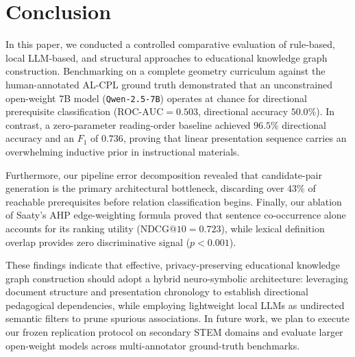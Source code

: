 \section{Conclusion}
\label{sec:conclusion}

In this paper, we conducted a controlled comparative evaluation of rule-based, local LLM-based, and structural approaches to educational knowledge graph construction. Benchmarking on a complete geometry curriculum against the human-annotated AL-CPL ground truth demonstrated that an unconstrained open-weight 7B model (\texttt{Qwen-2.5-7B}) operates at chance for directional prerequisite classification ($\text{ROC-AUC} = 0.503$, directional accuracy $50.0\%$). In contrast, a zero-parameter reading-order baseline achieved $96.5\%$ directional accuracy and an $F_1$ of $0.736$, proving that linear presentation sequence carries an overwhelming inductive prior in instructional materials.

Furthermore, our pipeline error decomposition revealed that candidate-pair generation is the primary architectural bottleneck, discarding over $43\%$ of reachable prerequisites before relation classification begins. Finally, our ablation of Saaty's AHP edge-weighting formula proved that sentence co-occurrence alone accounts for its ranking utility ($\text{NDCG@10} = 0.723$), while lexical definition overlap provides zero discriminative signal ($p < 0.001$).

These findings indicate that effective, privacy-preserving educational knowledge graph construction should adopt a hybrid neuro-symbolic architecture: leveraging document structure and presentation chronology to establish directional pedagogical dependencies, while employing lightweight local LLMs as undirected semantic filters to prune spurious associations. In future work, we plan to execute our frozen replication protocol on secondary STEM domains and evaluate larger open-weight models across multi-annotator ground-truth benchmarks.
